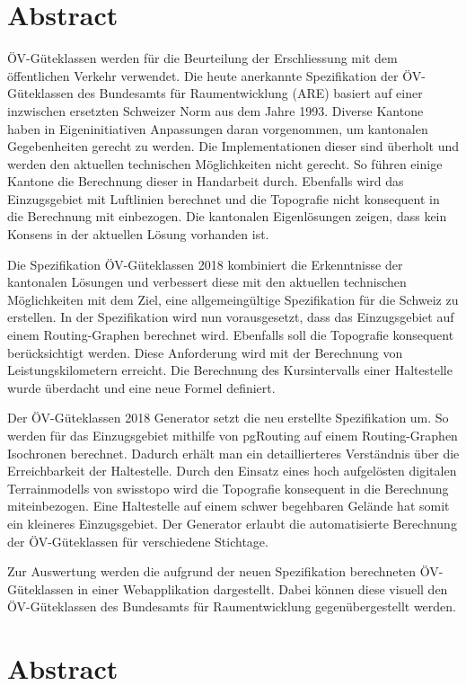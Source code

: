 
\chapter*{Abstract}
ÖV-Güteklassen werden für die Beurteilung der Erschliessung mit dem öffentlichen Verkehr verwendet.
Die heute anerkannte Spezifikation der ÖV-Güteklassen des Bundesamts für Raumentwicklung (ARE)  basiert auf einer inzwischen ersetzten Schweizer Norm aus dem Jahre 1993.
Diverse Kantone haben in Eigeninitiativen Anpassungen daran vorgenommen, um kantonalen Gegebenheiten gerecht zu werden.
Die Implementationen dieser sind überholt und werden den aktuellen technischen Möglichkeiten nicht gerecht.
So führen einige Kantone die Berechnung dieser in Handarbeit durch.
Ebenfalls wird das Einzugsgebiet mit Luftlinien berechnet und die Topografie nicht konsequent in die Berechnung mit einbezogen.
Die kantonalen Eigenlösungen zeigen, dass kein Konsens in der aktuellen Lösung vorhanden ist.

Die Spezifikation ÖV-Güteklassen 2018 kombiniert die Erkenntnisse der kantonalen Lösungen und verbessert diese mit den aktuellen technischen Möglichkeiten mit dem Ziel, eine allgemeingültige Spezifikation für die Schweiz zu erstellen.
In der Spezifikation wird nun vorausgesetzt, dass das Einzugsgebiet auf einem Routing-Graphen berechnet wird.
Ebenfalls soll die Topografie konsequent berücksichtigt werden.
Diese Anforderung wird mit der Berechnung von Leistungskilometern erreicht.
Die Berechnung des Kursintervalls einer Haltestelle wurde überdacht und eine neue Formel definiert.

Der ÖV-Güteklassen 2018 Generator setzt die neu erstellte Spezifikation um.
So werden für das Einzugsgebiet mithilfe von pgRouting auf einem Routing-Graphen Isochronen berechnet.
Dadurch erhält man ein detaillierteres Verständnis über die Erreichbarkeit der Haltestelle.
Durch den Einsatz eines hoch aufgelösten digitalen Terrainmodells von swisstopo wird die Topografie konsequent in die Berechnung miteinbezogen. Eine Haltestelle auf einem schwer begehbaren Gelände hat somit ein kleineres Einzugsgebiet.
Der Generator erlaubt die automatisierte Berechnung der ÖV-Güteklassen für verschiedene Stichtage.

Zur Auswertung werden die aufgrund der neuen Spezifikation berechneten ÖV-Güteklassen in einer Webapplikation dargestellt.
Dabei können diese visuell den ÖV-Güteklassen des Bundesamts für Raumentwicklung gegenübergestellt werden.


\cleardoublepage

\chapter*{Abstract}

